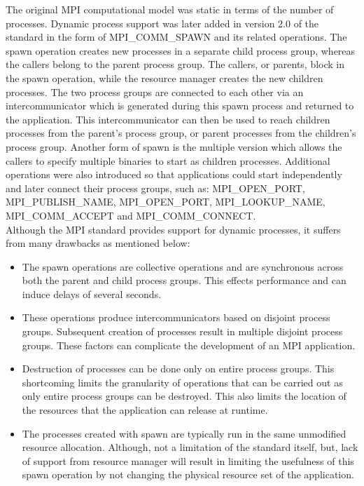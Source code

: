 The original MPI computational model was static in terms of the number of processes. Dynamic process support was later added in version 2.0 of the standard in the form of MPI{\_}COMM{\_}SPAWN and its related operations. The spawn operation creates new processes in a separate child process group, whereas the callers belong to the parent process group. The callers, or parents, block in the spawn operation, while the resource manager creates the new children processes. The two process groups are connected to each other via an intercommunicator which is generated during this spawn process and returned to the application. This intercommunicator can then be used to reach children processes from the parent's process group, or parent processes from the children's process group. Another form of spawn is the multiple version which allows the callers to specify multiple binaries to start as children processes. Additional operations were also introduced so that applications could start independently and later connect their process groups, such as: MPI{\_}OPEN{\_}PORT, MPI{\_}PUBLISH{\_}NAME, MPI{\_}OPEN{\_}PORT, MPI{\_}LOOKUP{\_}NAME, MPI{\_}COMM{\_}ACCEPT and MPI{\_}COMM{\_}CONNECT. \\

Although the MPI standard provides support for dynamic processes, it suffers from many drawbacks as mentioned below:
\begin{itemize}
\item The spawn operations are collective operations and are synchronous across both the parent and child process groups. This effects performance and can induce delays of several seconds.
\item These operations produce intercommunicators based on disjoint process groups. Subsequent creation of processes result in multiple disjoint process groups. These factors can complicate the development of an MPI application.
\item Destruction of processes can be done only on entire process groups. This shortcoming limits the granularity of operations that can be carried out as only entire process groups can be destroyed. This also limits the location of the resources that the application can release at runtime.
\item The processes created with spawn are typically run in the same unmodified resource allocation. Although, not a limitation of the standard itself, but, lack of support from resource manager will result in limiting the usefulness of this spawn operation by not changing the physical resource set of the application.
\end{itemize}

